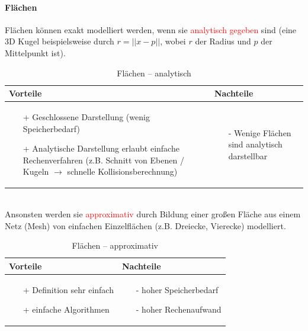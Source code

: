 \paragraph*{Flächen}
Flächen können exakt modelliert werden, wenn sie \textcolor{red}{analytisch gegeben} sind (eine 3D Kugel beispielsweise durch $r = ||x-p||$, wobei $r$ der Radius und $p$ der Mittelpunkt ist).
\begin{table}[hbt]
\centering
\begin{tabular}{|p{6.5cm}|p{6.5cm}|}
\hline
Vorteile & Nachteile\\
\hline
\vspace{-5mm}
\begin{itemize}
\setlength\itemsep{0em}
\item[+] Geschlossene Darstellung (wenig Speicherbedarf)
\item[+] Analytische Darstellung erlaubt einfache Rechenverfahren (z.B.
Schnitt von Ebenen / Kugeln $\rightarrow$ schnelle Kollisionsberechnung)
\end{itemize}
 &
 \vspace{-5mm}
\begin{itemize}
\setlength\itemsep{0em}
\item[-] Wenige Flächen sind analytisch darstellbar
\end{itemize}\\
\hline
\end{tabular}
\caption{Flächen -- analytisch}
\label{tab:Flaechen-analyt}
\end{table}\\ 
Ansonsten werden sie \textcolor{red}{approximativ} durch Bildung einer großen Fläche aus einem Netz (\glqq Mesh\grqq ) von einfachen Einzelflächen (z.B. Dreiecke, Vierecke) modelliert.\\
\begin{table}[hbt]
\centering
\begin{tabular}{|p{6.5cm}|p{6.5cm}|}
\hline
Vorteile & Nachteile\\
\hline
\vspace{-5mm}
\begin{itemize}
\setlength\itemsep{0em}
\item[+] Definition sehr einfach
\item[+] einfache Algorithmen
\end{itemize}
 &
 \vspace{-5mm}
\begin{itemize}
\setlength\itemsep{0em}
\item[-] hoher Speicherbedarf
\item[-] hoher Rechenaufwand
\end{itemize}\\
\hline
\end{tabular}
\caption{Flächen -- approximativ}
\label{tab:Flaechen_approx}
\end{table}
